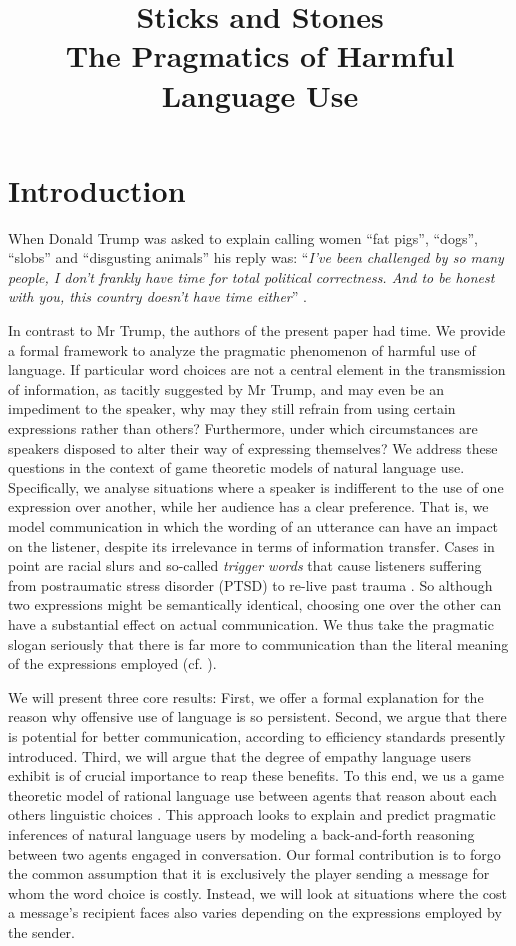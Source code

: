 \documentclass[10pt,a4paper]{article}
\title{%
  Sticks and Stones \\
  \large The Pragmatics of Harmful Language Use}
\date{}
\begin{document}
\renewcommand{\arraystretch}{1.5}
\maketitle

\section{Introduction}
When Donald Trump was asked to explain calling women ``fat pigs'', ``dogs'', ``slobs'' and ``disgusting animals'' his reply was: ``\textit{I’ve been challenged by so many people, I don’t frankly have time for total political correctness. And to be honest with you, this country doesn’t have time either}'' \cite{weigel2016}.

In contrast to Mr Trump, the authors of the present paper had time. We provide a formal framework to analyze the pragmatic phenomenon of harmful use of language. If particular word choices are not a central element in the transmission of information, as tacitly suggested by Mr Trump, and may even be an impediment to the speaker, why may they still refrain from using certain expressions rather than others? Furthermore, under which circumstances are speakers disposed to alter their way of expressing themselves? We address these questions in the context of game theoretic models of natural language use. Specifically, we analyse situations where a speaker is indifferent to the use of one expression over another, while her audience has a clear preference. That is, we model communication in which the wording of an utterance can have an impact on the listener, despite its irrelevance in terms of information transfer. Cases in point are racial slurs and so-called \textit{trigger words} that cause listeners suffering from postraumatic stress disorder (PTSD) to re-live past trauma \cite{fagan2004confronting, yehuda2002post}. So although two expressions might be semantically identical, choosing one over the other can have a substantial effect on actual communication. We thus take the pragmatic slogan seriously that there is far more to communication than the literal meaning of the expressions employed (cf. \cite{grice1975logic}).

We will present three core results: First, we offer a formal explanation for the reason why offensive use of language is so persistent. Second, we argue that there is potential for better communication, according to efficiency standards presently introduced. Third, we will argue that the degree of empathy language users exhibit is of crucial importance to reap these benefits. To this end, we us a game theoretic model of rational language use between agents that reason about each others linguistic choices \cite{franke2014pragmatic}. This approach looks to explain and predict pragmatic inferences of natural language users by modeling a back-and-forth reasoning between two agents engaged in conversation.
Our formal contribution is to forgo the common assumption that it is exclusively the player sending a message for whom the word choice is costly. Instead, we will look at situations where the cost a message's recipient faces also varies depending on the expressions employed by the sender.
\end{document}
